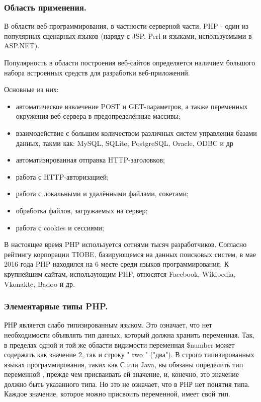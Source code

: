 \subsubsection{Область применения. }
\label{sub:practice:whereis_php}
В области веб-программирования, в частности серверной части, PHP - один из популярных сценарных языков (наряду с JSP, Perl и языками, используемыми в ASP.NET).

Популярность в области построения веб-сайтов определяется наличием большого набора встроенных средств для разработки веб-приложений. 

Основные из них:
\begin{itemize}
  \item автоматическое извлечение POST и GET-параметров, а также переменных окружения веб-сервера в предопределённые массивы;
  \item взаимодействие с большим количеством различных систем управления базами данных, такми как: MySQL,  SQLite, PostgreSQL, Oracle, ODBC и др
  \item автоматизированная отправка HTTP-заголовков;
  \item работа с HTTP-авторизацией;
  \item работа с локальными и удалёнными файлами, сокетами;
  \item обработка файлов, загружаемых на сервер;
  \item работа с cookies и сессиями;
\end{itemize}

В настоящее время PHP используется сотнями тысяч разработчиков. Согласно рейтингу корпорации TIOBE, базирующемся на данных поисковых систем, в мае 2016 года PHP находился на 6 месте среди языков программирования. К крупнейшим сайтам, использующим PHP, относятся Facebook, Wikipedia, Vkonakte, Badoo и др.



\subsubsection{Элементарные типы PHP. }
\label{sub:practice:types_php}

РНР является слабо типизированным языком. Это означает, что нет необходимости объявлять тип данных, который должна хранить переменная. Так, в пределах одной и той же области видимости переменная \$number может содержать как значение 2, так и строку " two " ("два"). В строго типизированных языках программирования, таких как С или Java, вы обязаны определить тип переменной , прежде чем присваивать ей значение, и, конечно, это значение должно быть указанного типа. Но это не означает, что в РНР нет понятия типа. Каждое значение, которое можно присвоить переменной, имеет свой тип.

